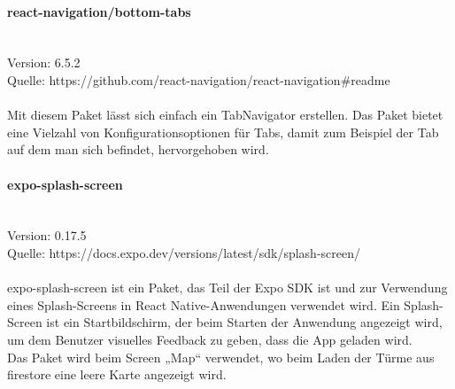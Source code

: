\paragraph{react-navigation/bottom-tabs}\mbox{}\\
Version: 6.5.2\\
Quelle: https://github.com/react-navigation/react-navigation\#readme\\ \\
Mit diesem Paket lässt sich einfach ein TabNavigator erstellen. Das Paket bietet eine Vielzahl von Konfigurationsoptionen für Tabs, damit zum Beispiel der Tab auf dem man sich befindet, hervorgehoben wird.\\

\paragraph{expo-splash-screen}\mbox{}\\
Version: 0.17.5\\
Quelle: https://docs.expo.dev/versions/latest/sdk/splash-screen/\\ \\
expo-splash-screen ist ein Paket, das Teil der Expo \Gls{SDK} ist und zur Verwendung eines Splash-Screens in React Native-Anwendungen verwendet wird. Ein Splash-Screen ist ein Startbildschirm, der beim Starten der Anwendung angezeigt wird, um dem Benutzer visuelles Feedback zu geben, dass die App geladen wird.\\
Das Paket wird beim Screen „Map“ verwendet, wo beim Laden der Türme aus firestore eine leere Karte angezeigt wird.\\


